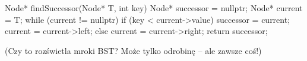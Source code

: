 \documentclass[12pt]{article}
\begin{document}
\begin{cppcode}
Node* findSuccessor(Node* T, int key) {
    Node* successor = nullptr;
    Node* current = T;
    while (current != nullptr) {
        if (key < current->value) {
            successor = current;
            current = current->left;
        } else {
            current = current->right;
        }
    }
    return successor;
}
\end{cppcode}

(Czy to rozświetla mroki BST? Może tylko odrobinę – ale zawsze coś!)
\end{document}
